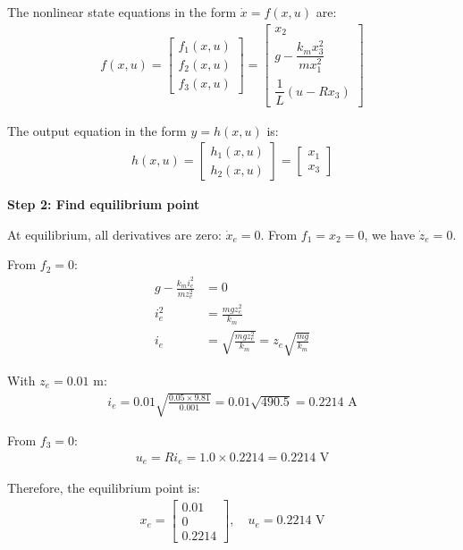 \documentclass[11pt,a4paper]{article}
\begin{document}
The nonlinear state equations in the form $\dot{x} = f(x,u)$ are:
\begin{align}
  f(x,u) = \begin{bmatrix}
    f_1(x,u)\\
    f_2(x,u)\\
    f_3(x,u)
  \end{bmatrix} = \begin{bmatrix}
    x_2\\[0.3em]
    g - \dfrac{k_m x_3^2}{m x_1^2}\\[0.5em]
    \dfrac{1}{L}(u - Rx_3)
  \end{bmatrix}
\end{align}

The output equation in the form $y = h(x,u)$ is:
\begin{align}
  h(x,u) = \begin{bmatrix}
    h_1(x,u)\\
    h_2(x,u)
  \end{bmatrix} = \begin{bmatrix}
    x_1\\
    x_3
  \end{bmatrix}
\end{align}

\textbf{Step 2: Find equilibrium point}

At equilibrium, all derivatives are zero: $\dot{x}_e = 0$. From $f_1 = x_2 = 0$, we have $\dot{z}_e = 0$.

From $f_2 = 0$:
\begin{align}
  g - \frac{k_m i_e^2}{m z_e^2} &= 0\\
  i_e^2 &= \frac{m g z_e^2}{k_m}\\
  i_e &= \sqrt{\frac{m g z_e^2}{k_m}} = z_e\sqrt{\frac{mg}{k_m}}
\end{align}

With $z_e = 0.01$ m:
\begin{align}
  i_e = 0.01\sqrt{\frac{0.05 \times 9.81}{0.001}} = 0.01\sqrt{490.5} = 0.2214 \text{ A}
\end{align}

From $f_3 = 0$:
\begin{align}
  u_e = R i_e = 1.0 \times 0.2214 = 0.2214 \text{ V}
\end{align}

Therefore, the equilibrium point is:
\begin{align}
  x_e = \begin{bmatrix} 0.01 \\ 0 \\ 0.2214 \end{bmatrix}, \quad u_e = 0.2214 \text{ V}
\end{align}
\end{document}
